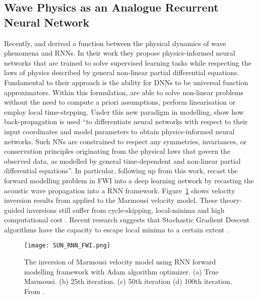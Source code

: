 \subsection{Wave Physics as an Analogue Recurrent Neural Network}
Recently, \citet{Raissi2019} and \citet{Hughes2019} derived a function between the physical dynamics of wave phenomena and RNNs. In their work they propose physics-informed neural networks that are trained to solve supervised learning tasks while respecting the laws of physics described by general non-linear partial differential equations. Fundamental to their approach is the ability for DNNs to be universal function approximators. Within this formulation, \cite{Raissi2019} are able to solve non-linear problems without the need to compute a priori assumptions, perform linearisation or employ local time-stepping. Under this new paradigm in modelling, \citet{Raissi2019} show how back-propagation is used ``to differentiate neural networks with respect to their input coordinates and model parameters to obtain physics-informed neural networks. Such \acp{NN} are constrained to respect any symmetries, invariances, or conservation principles originating from the physical laws that govern the observed data, as modelled by general time-dependent and non-linear partial differential equations''. In particular, following up from this work, \cite{Sun2019} recast the forward modelling problem in FWI into a deep learning network by recasting the acoustic wave propagation into a RNN framework. Figure~\ref{fig:RNN_FWI_Marmousi} shows velocity inversion results from \cite{Sun2019} applied to the Marmousi velocity model. These theory-guided inversions still suffer from cycle-skipping, local-minima and high computational cost \citep{Sun2019}. Recent research suggests that Stochastic Gradient Descent algorithms have the capacity to escape local minima to a certain extent \citep{Sun2019}. 


\begin{figure}[ht!]
	\centering
	\texttt{[image: SUN\_RNN\_FWI.png]}
	\caption[The inversion of Marmousi velocity model using RNN forward modelling.]{The inversion of Marmousi velocity model using RNN forward modelling framework with Adam algorithm optimizer. (a) True Marmousi. (b) 25th iteration. (c) 50th iteration (d) 100th iteration. From \cite{Sun2019}.}
	\label{fig:RNN_FWI_Marmousi}
\end{figure}